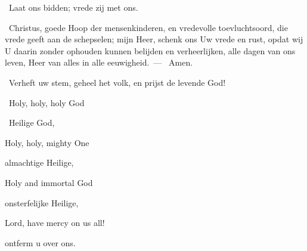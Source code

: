 \documentclass[12pt,twoside,a5paper]{article}
\begin{document}
\begin{halfparskip}
  \rr~Laat ons bidden; vrede zij met ons.

  \cc~Christus, goede Hoop der mensenkinderen, en vredevolle toevluchtsoord, die vrede geeft aan de schepselen; mijn Heer, schenk ons Uw vrede en rust, opdat wij U daarin zonder ophouden kunnen belijden en verheerlijken, alle dagen van ons leven, Heer van alles in alle eeuwigheid.~--- \rr~Amen.
\end{halfparskip}



\begin{halfparskip}
  \dd~Verheft uw stem, geheel het volk, en prijst de levende God!
\end{halfparskip}

\vspace{0.5em}

\begin{doublecols}
  \englishl \rr~Holy, holy, holy God

   \rr~Heilige God,

  \englishl Holy, holy, mighty One

   almachtige Heilige,

  \englishl Holy and immortal God

   onsterfelijke Heilige,

  \englishl Lord, have mercy on us all!

   ontferm u over ons.
\end{doublecols}
\end{document}
